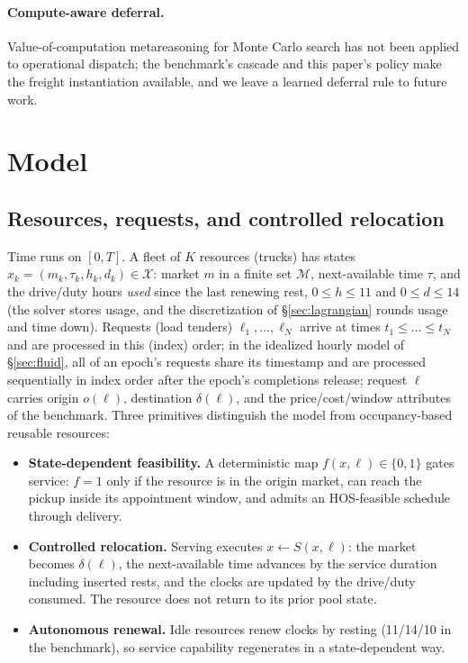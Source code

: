 \documentclass[11pt]{article}
\begin{document}
\paragraph{Compute-aware deferral.} Value-of-computation metareasoning
for Monte Carlo search \citep{sezener2020voc} has not been applied to
operational dispatch; the benchmark's cascade and this paper's policy
make the freight instantiation available, and we leave a learned
deferral rule to future work.

\section{Model}
\label{sec:model}

\subsection{Resources, requests, and controlled relocation}

Time runs on $[0, T]$. A fleet of $K$ resources (trucks) has
states $x_k = (m_k, \tau_k, h_k, d_k) \in \mathcal{X}$: market $m$ in a
finite set $\mathcal{M}$, next-available time $\tau$, and the
drive/duty hours \emph{used} since the last renewing rest,
$0 \leq h \leq 11$ and $0 \leq d \leq 14$ (the solver stores usage, and
the discretization of \S\ref{sec:lagrangian} rounds usage and time
down). Requests (load tenders)
$\ell_1, \dots, \ell_N$ arrive at times $t_1 \leq \dots \leq t_N$
and are processed in this (index) order; in the idealized hourly model
of \S\ref{sec:fluid}, all of an epoch's requests share its timestamp
and are processed sequentially in index order after the epoch's
completions release; request
$\ell$ carries origin $o(\ell)$, destination $\delta(\ell)$, and the
price/cost/window attributes of the benchmark. Three primitives
distinguish the model from occupancy-based reusable resources:

\begin{itemize}
\item \textbf{State-dependent feasibility.} A deterministic map
  $f(x, \ell) \in \{0, 1\}$ gates service: $f = 1$ only if the resource
  is in the origin market, can reach the pickup inside its appointment
  window, and admits an HOS-feasible schedule through delivery.
\item \textbf{Controlled relocation.} Serving executes
  $x \leftarrow S(x, \ell)$: the market becomes $\delta(\ell)$, the
  next-available time advances by the service duration including
  inserted rests, and the clocks are updated by the drive/duty consumed.
  The resource does not return to its prior pool state.
\item \textbf{Autonomous renewal.} Idle resources renew clocks by
  resting (11/14/10 in the benchmark), so service capability regenerates
  in a state-dependent way.
\end{itemize}
\end{document}
